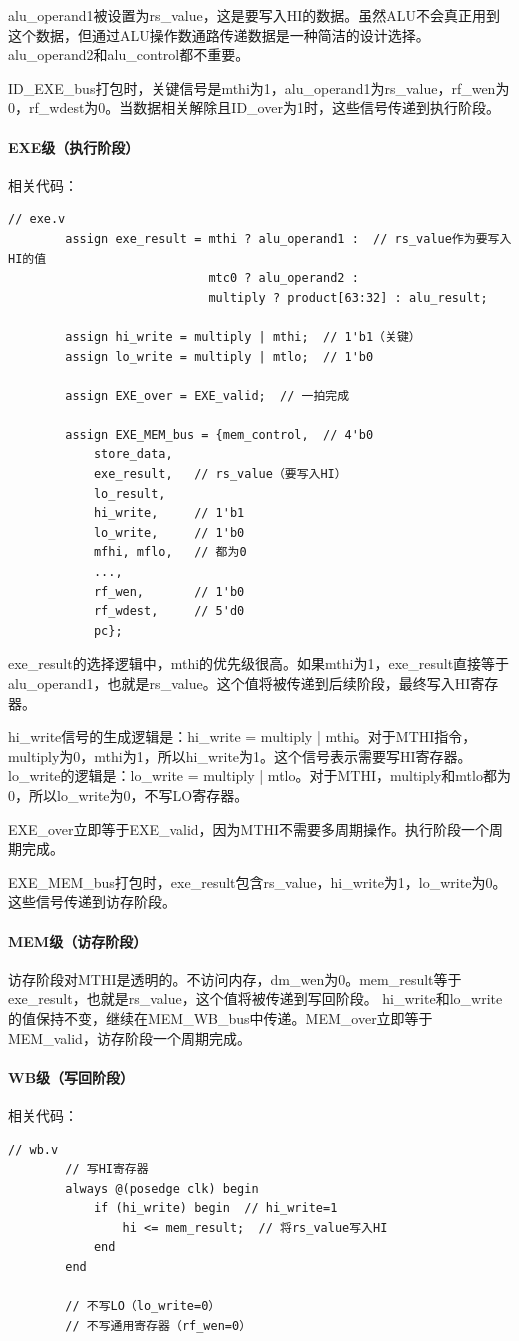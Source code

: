 \documentclass[a4paper]{article}
\begin{document}
	alu\_operand1被设置为rs\_value，这是要写入HI的数据。虽然ALU不会真正用到这个数据，但通过ALU操作数通路传递数据是一种简洁的设计选择。alu\_operand2和alu\_control都不重要。
	
	ID\_EXE\_bus打包时，关键信号是mthi为1，alu\_operand1为rs\_value，rf\_wen为0，rf\_wdest为0。当数据相关解除且ID\_over为1时，这些信号传递到执行阶段。
	\paragraph{EXE级（执行阶段）}
	相关代码：
	\begin{lstlisting}[caption={EXE}]
		// exe.v
		assign exe_result = mthi ? alu_operand1 :  // rs_value作为要写入HI的值
							mtc0 ? alu_operand2 :
							multiply ? product[63:32] : alu_result;
		
		assign hi_write = multiply | mthi;  // 1'b1（关键）
		assign lo_write = multiply | mtlo;  // 1'b0
		
		assign EXE_over = EXE_valid;  // 一拍完成
		
		assign EXE_MEM_bus = {mem_control,  // 4'b0
			store_data,   
			exe_result,   // rs_value（要写入HI）
			lo_result,    
			hi_write,     // 1'b1
			lo_write,     // 1'b0
			mfhi, mflo,   // 都为0
			...,
			rf_wen,       // 1'b0
			rf_wdest,     // 5'd0
			pc};
	\end{lstlisting}
	
	exe\_result的选择逻辑中，mthi的优先级很高。如果mthi为1，exe\_result直接等于alu\_operand1，也就是rs\_value。这个值将被传递到后续阶段，最终写入HI寄存器。
	
	hi\_write信号的生成逻辑是：hi\_write = multiply | mthi。对于MTHI指令，multiply为0，mthi为1，所以hi\_write为1。这个信号表示需要写HI寄存器。
	lo\_write的逻辑是：lo\_write = multiply | mtlo。对于MTHI，multiply和mtlo都为0，所以lo\_write为0，不写LO寄存器。
	
	EXE\_over立即等于EXE\_valid，因为MTHI不需要多周期操作。执行阶段一个周期完成。
	
	EXE\_MEM\_bus打包时，exe\_result包含rs\_value，hi\_write为1，lo\_write为0。这些信号传递到访存阶段。
	\paragraph{MEM级（访存阶段）}
	访存阶段对MTHI是透明的。不访问内存，dm\_wen为0。mem\_result等于exe\_result，也就是rs\_value，这个值将被传递到写回阶段。
	hi\_write和lo\_write的值保持不变，继续在MEM\_WB\_bus中传递。MEM\_over立即等于MEM\_valid，访存阶段一个周期完成。
	\paragraph{WB级（写回阶段）}
	相关代码：
	\begin{lstlisting}[caption={WB}]
		// wb.v
		// 写HI寄存器
		always @(posedge clk) begin
			if (hi_write) begin  // hi_write=1
				hi <= mem_result;  // 将rs_value写入HI
			end
		end
		
		// 不写LO（lo_write=0）
		// 不写通用寄存器（rf_wen=0）
	\end{lstlisting}
	
\end{document}
